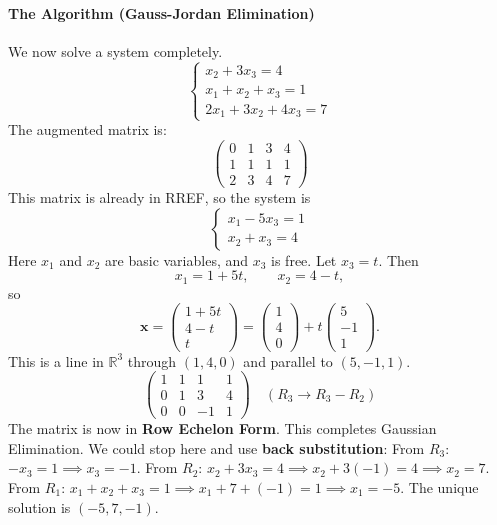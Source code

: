 \paragraph{The Algorithm (Gauss-Jordan Elimination)}
We now solve a system completely.
\[
\begin{cases}
x_2 + 3x_3 = 4 \\
x_1 + x_2 + x_3 = 1 \\
2x_1 + 3x_2 + 4x_3 = 7
\end{cases}
\]
The augmented matrix is:
\[
\left(\begin{array}{ccc|c}
0 & 1 & 3 & 4 \\
1 & 1 & 1 & 1 \\
2 & 3 & 4 & 7
\end{array}\right)
\]
This matrix is already in RREF, so the system is
\[
\begin{cases}
x_1 - 5x_3 = 1 \\
x_2 + x_3 = 4
\end{cases}
\]
Here $x_1$ and $x_2$ are basic variables, and $x_3$ is free. Let $x_3=t$. Then
\[
x_1=1+5t, \qquad x_2=4-t,
\]
so
\[
\mathbf{x}=\begin{pmatrix}1+5t\\4-t\\t\end{pmatrix}
=\begin{pmatrix}1\\4\\0\end{pmatrix}+t\begin{pmatrix}5\\-1\\1\end{pmatrix}.
\]
This is a line in $\mathbb{R}^3$ through $(1,4,0)$ and parallel to $(5,-1,1)$.
\[
\left(\begin{array}{ccc|c}
1 & 1 & 1 & 1 \\
0 & 1 & 3 & 4 \\
0 & 0 & -1 & 1
\end{array}\right) \quad (R_3 \to R_3 - R_2)
\]
The matrix is now in \textbf{Row Echelon Form}. This completes Gaussian Elimination.
We could stop here and use \textbf{back substitution}:
From $R_3$: $-x_3 = 1 \implies x_3 = -1$.
From $R_2$: $x_2 + 3x_3 = 4 \implies x_2 + 3(-1) = 4 \implies x_2 = 7$.
From $R_1$: $x_1 + x_2 + x_3 = 1 \implies x_1 + 7 + (-1) = 1 \implies x_1 = -5$.
The unique solution is $(-5, 7, -1)$.

